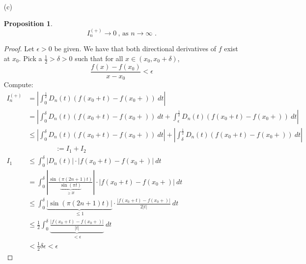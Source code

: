 \documentclass[12pt, reqno]{amsart}
\newtheorem{prop}{Proposition}[section]
\theoremstyle{definition}
\theoremstyle{remark}
\begin{document}
\begin{itemize}
\begin{itemize}
\begin{proof}
So, \begin{align*}
\left|S_{n}[f](x_{0})- \alpha_{x_{0}}\right|&= \left|\int_{0}^{\frac{1}{2}}D_{n}(t)(f(x_{0}+t)+f(x_{0}-t))\ dt- \alpha_{x_{0}}\right|\\
&= \left|\int_{0}^{\frac{1}{2}}D_{n}(t)(f(x_{0}+t)+f(x_{0}-t))\ dt- 2\int_{0}^{\frac{1}{2}}\alpha_{x_{0}}D_{n}(t)\ dt\right|\\
&= \left|\int_{0}^{\frac{1}{2}}D_{n}(t)(f(x_{0}+t)+f(x_{0}-t)-\alpha_{x_{0}})\ dt\right|\\
&= \left|\int_{0}^{\frac{1}{2}}D_{n}(t)(f(x_{0}+t)-f(x_{0}+)+f(x_{0}-t)-f(x_{0}-))\ dt\right|\\
&\le \left|\int_{0}^{\frac{1}{2}}D_{n}(t)(f(x_{0}+t)-f(x_{0}+))\ dt\right|\\
&\quad\quad\quad\quad+\left|\int_{0}^{\frac{1}{2}}D_{n}(t)(f(x_{0}-t)-f(x_{0}-))\ dt\right|=: I_{n}^{(+)}+I_{n}^{(-)}
\end{align*}
\end{proof}


\vspace{0.1 cm}
\item[(c)] %
\begin{prop}
\begin{equation} 
I_n^{(+)} \to 0 ~\mbox{, as $n \to \infty$ .}
\end{equation}
\end{prop}

\begin{proof}
   Let $\epsilon>0$ be given. We have that both directional derivatives of $f$ exist at $x_{0}$. Pick a $\frac{1}{2}>\delta>0$ such that for all $x\in(x_{0},x_{0}+\delta)$, $$\frac{f(x)-f(x_{0})}{x-x_{0}}< \epsilon$$
Compute:
\begin{align*}
	I_{n}^{(+)}&= \left|\int_{0}^{\frac{1}{2}}D_{n}(t)(f(x_{0}+t)-f(x_{0}+))\ dt\right|\\
 &= \left|\int_{0}^{\delta}D_{n}(t)(f(x_{0}+t)-f(x_{0}+))\ dt+\int_{\epsilon}^{\frac{1}{2}}D_{n}(t)(f(x_{0}+t)-f(x_{0}+))\ dt\right|\\
 &\le \left|\int_{0}^{\delta}D_{n}(t)(f(x_{0}+t)-f(x_{0}+))\ dt\right|+\left|\int_{\delta}^{\frac{1}{2}}D_{n}(t)(f(x_{0}+t)-f(x_{0}+))\ dt\right|\\
&\quad\quad\quad\quad:= I_{1}+I_{2}\\
I_{1}&\le \int_{0}^{\delta}\left|D_{n}(t)\right|\cdot\left|f(x_{0}+t)-f(x_{0}+)\right|\ dt\\
&= \int_{0}^{\delta}\left|\frac{\sin (\pi(2n+1)t)}{\underbrace{\sin(\pi t)}_{\ge 2t}}\right|\cdot|f(x_{0}+t)-f(x_{0}+)|\ dt\\
&\le \int_{0}^{\delta}\underbrace{|\sin(\pi(2n+1)t)|}_{\le1}\cdot \frac{|f(x_{0}+t)-f(x_{0}+)|}{2|t|}\ dt\\
&\le \frac{1}{2}\int_{0}^{\delta} \underbrace{\frac{|f(x_{0}+t)-f(x_{0}+)|}{|t|}}_{< \epsilon}\ dt\\
&< \frac{1}{2}\delta\epsilon<\epsilon
\end{align*}



\end{proof}
\end{itemize}
\end{itemize}
\end{document}
